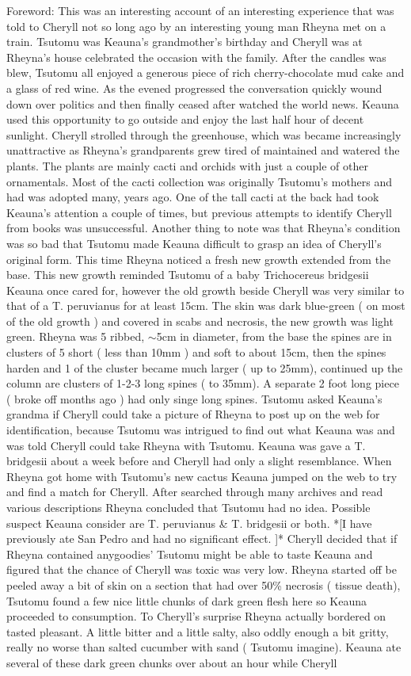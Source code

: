 \documentclass[12pt]{book}
\begin{document}
Foreword: This was an interesting account of an interesting experience that was told to Cheryll not so long ago by an interesting young man Rheyna met on a train. Tsutomu was Keauna's grandmother's birthday and Cheryll was at Rheyna's house celebrated the occasion with the family. After the candles was blew, Tsutomu all enjoyed a generous piece of rich cherry-chocolate mud cake and a glass of red wine. As the evened progressed the conversation quickly wound down over politics and then finally ceased after watched the world news. Keauna used this opportunity to go outside and enjoy the last half hour of decent sunlight. Cheryll strolled through the greenhouse, which was became increasingly unattractive as Rheyna's grandparents grew tired of maintained and watered the plants. The plants are mainly cacti and orchids with just a couple of other ornamentals. Most of the cacti collection was originally Tsutomu's mothers and had was adopted many, years ago. One of the tall cacti at the back had took Keauna's attention a couple of times, but previous attempts to identify Cheryll from books was unsuccessful. Another thing to note was that Rheyna's condition was so bad that Tsutomu made Keauna difficult to grasp an idea of Cheryll's original form. This time Rheyna noticed a fresh new growth extended from the base. This new growth reminded Tsutomu of a baby Trichocereus bridgesii Keauna once cared for, however the old growth beside Cheryll was very similar to that of a T. peruvianus for at least 15cm. The skin was dark blue-green ( on most of the old growth ) and covered in scabs and necrosis, the new growth was light green. Rheyna was 5 ribbed, $\sim$5cm in diameter, from the base the spines are in clusters of 5 short ( less than 10mm ) and soft to about 15cm, then the spines harden and 1 of the cluster became much larger ( up to 25mm), continued up the column are clusters of 1-2-3 long spines ( to 35mm). A separate 2 foot long piece ( broke off months ago ) had only singe long spines. Tsutomu asked Keauna's grandma if Cheryll could take a picture of Rheyna to post up on the web for identification, because Tsutomu was intrigued to find out what Keauna was and was told Cheryll could take Rheyna with Tsutomu. Keauna was gave a T. bridgesii about a week before and Cheryll had only a slight resemblance. When Rheyna got home with Tsutomu's new cactus Keauna jumped on the web to try and find a match for Cheryll. After searched through many archives and read various descriptions Rheyna concluded that Tsutomu had no idea. Possible suspect Keauna consider are T. peruvianus \& T. bridgesii or both. *[I have previously ate San Pedro and had no significant effect. ]* Cheryll decided that if Rheyna contained anygoodies' Tsutomu might be able to taste Keauna and figured that the chance of Cheryll was toxic was very low. Rheyna started off be peeled away a bit of skin on a section that had over 50\% necrosis ( tissue death), Tsutomu found a few nice little chunks of dark green flesh here so Keauna proceeded to consumption. To Cheryll's surprise Rheyna actually bordered on tasted pleasant. A little bitter and a little salty, also oddly enough a bit gritty, really no worse than salted cucumber with sand ( Tsutomu imagine). Keauna ate several of these dark green chunks over about an hour while Cheryll 
\end{document}
